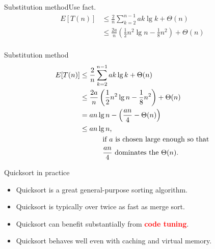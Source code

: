 \documentclass{beamer}
\begin{document}
\begin{frame}{Substitution method}{Use fact.}
    \begin{equation*}
        \begin{split}
        E[T(n)] &\leq \frac{2}{n}\sum\limits_{k=2}^{n-1} a k \lg k + \Theta(n) \\
                &\leq \frac{2a}{n} \left( \frac{1}{2}n^2 \lg n - \frac{1}{8}n^2 \right) + \Theta(n) \\
        \end{split}
    \end{equation*}
\end{frame}

\begin{frame}{Substitution method}
    \begin{equation*}
        \begin{split}
        E[T(n)] &\leq \frac{2}{n}\sum\limits_{k=2}^{n-1} a k \lg k + \Theta(n) \\
                &\leq \frac{2a}{n} \left( \frac{1}{2}n^2 \lg n - \frac{1}{8}n^2 \right) + \Theta(n) \\
                &= a n \lg n - \left( \frac{an}{4} - \Theta(n) \right) \\
                &\leq a n \lg n \text{,} \\
                &\text{\hspace{10mm} if $a$ is chosen large enough so that} \\
                &\text{\hspace{10mm} $\frac{an}{4}$ dominates the $\Theta(n)$.}
        \end{split}
    \end{equation*}
\end{frame}

\begin{frame}{Quicksort in practice}
    \begin{itemize}
        \item Quicksort is a great general-purpose sorting algorithm.
        \item Quicksort is typically over twice as fast as merge sort.
        \item Quicksort can benefit substantially from \textcolor{red}{\textbf{code tuning}}.
        \item Quicksort behaves well even with caching and virtual memory.
    \end{itemize}
\end{frame}
\end{document}
